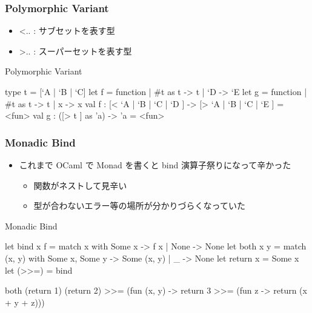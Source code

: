 \documentclass[dvipdfmx,14pt,notheorems,aspectratio=169]{beamer}
\theoremstyle{definition}
\begin{document}
    \begin{frame}[fragile]\frametitle{Polymorphic Variant}
        \begin{itemize}
            \item \lbrack \textless .. \rbrack : サブセットを表す型
            \item \lbrack \textgreater .. \rbrack : スーパーセットを表す型
        \end{itemize}
        \begin{exampleblock}{Polymorphic Variant}
            \scriptsize
            \begin{verbatimtab}
type t = [`A | `B | `C]
let f = function
    | #t as t -> t
    | `D -> `E
let g = function
    | #t as t -> t
    | x -> x
val f : [< `A | `B | `C | `D ] -> [> `A | `B | `C | `E ] = <fun>
val g : ([> t ] as 'a) -> 'a = <fun>
\end{verbatimtab}
        \end{exampleblock}
    \end{frame}

\begin{frame}[fragile]\frametitle{Monadic Bind}
    \begin{itemize}
        \item これまで OCaml で Monad を書くと bind 演算子祭りになって辛かった
        \begin{itemize}
            \item 関数がネストして見辛い
            \item 型が合わないエラー等の場所が分かりづらくなっていた
        \end{itemize}
    \end{itemize}
    \begin{exampleblock}{Monadic Bind}
        \scriptsize
        \begin{verbatimtab}
let bind x f = match x with Some x -> f x | None -> None
let both x y = match (x, y) with Some x, Some y -> Some (x, y) | _ -> None
let return x = Some x
let (>>=) = bind

both (return 1) (return 2) >>= (fun (x, y) ->
return 3 >>= (fun z ->
return (x + y + z)))
\end{verbatimtab}
    \end{exampleblock}
\end{frame}
\end{document}
